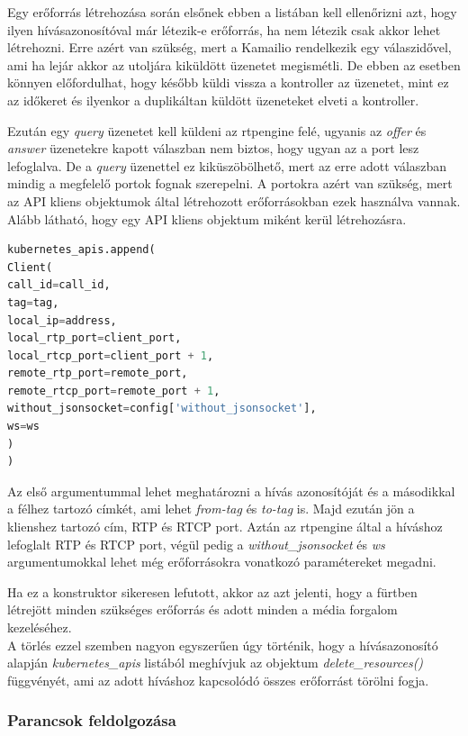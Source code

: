 Egy erőforrás létrehozása során elsőnek ebben a listában kell ellenőrizni azt, hogy
ilyen hívásazonosítóval már létezik-e erőforrás, ha nem létezik csak akkor lehet létrehozni. 
Erre azért van szükség, mert a Kamailio rendelkezik egy válaszidővel, ami ha lejár
akkor az utoljára kiküldött üzenetet megismétli. De ebben az esetben könnyen előfordulhat,
hogy később küldi vissza a kontroller az üzenetet, mint ez az időkeret és ilyenkor 
a duplikáltan küldött üzeneteket elveti a kontroller.

Ezután egy \textit{query} üzenetet kell küldeni az rtpengine felé, ugyanis az 
\textit{offer} és \textit{answer} üzenetekre kapott válaszban nem biztos, hogy ugyan
az a port lesz lefoglalva. De a \textit{query} üzenettel ez kiküszöbölhető, mert az 
erre adott válaszban mindig a megfelelő portok fognak szerepelni. A portokra azért van
szükség, mert az API kliens objektumok által létrehozott erőforrásokban ezek használva
vannak. Alább látható, hogy egy API kliens objektum miként kerül létrehozásra.

\begin{lstlisting}[language=python, caption=Kubernetes API kliens objektum létrehozása, label=lst:kubeAPI]
kubernetes_apis.append(
Client(
call_id=call_id,
tag=tag,
local_ip=address,
local_rtp_port=client_port,
local_rtcp_port=client_port + 1,
remote_rtp_port=remote_port,
remote_rtcp_port=remote_port + 1,
without_jsonsocket=config['without_jsonsocket'],
ws=ws
)
)
\end{lstlisting}

Az első argumentummal lehet meghatározni a hívás azonosítóját és a másodikkal a félhez
tartozó címkét, ami lehet \textit{from-tag} és \textit{to-tag} is. Majd ezután jön a
klienshez tartozó cím, RTP és RTCP port. Aztán az rtpengine által a híváshoz lefoglalt
RTP és RTCP port, végül pedig a \textit{without\_jsonsocket} és \textit{ws} argumentumokkal
lehet még erőforrásokra vonatkozó paramétereket megadni.

Ha ez a konstruktor sikeresen lefutott, akkor az azt jelenti, hogy a fürtben létrejött
minden szükséges erőforrás és adott minden a média forgalom kezeléséhez. \\

A törlés ezzel szemben nagyon egyszerűen úgy történik, hogy a hívásazonosító alapján
\textit{kubernetes\_apis} listából meghívjuk az objektum \textit{delete\_resources()}
függvényét, ami az adott híváshoz kapcsolódó összes erőforrást törölni fogja.

\subsubsection{Parancsok feldolgozása}

